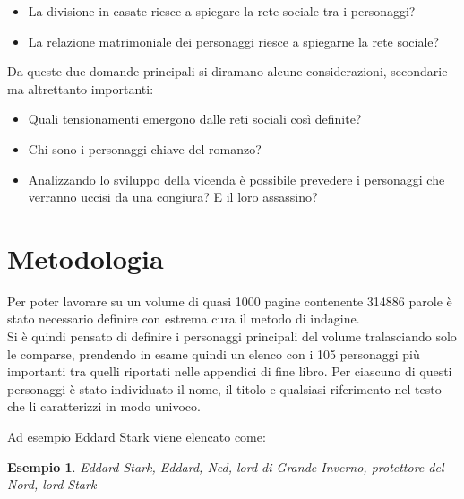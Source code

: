 \documentclass[a4paper]{article}
\begin{document}
\begin{itemize}
\item La divisione in casate riesce a spiegare la rete sociale tra i personaggi?
\item La relazione matrimoniale dei personaggi riesce a spiegarne la rete sociale?
\end{itemize}
Da queste due domande principali si diramano alcune considerazioni, secondarie ma altrettanto importanti:

\begin{itemize}
\item Quali tensionamenti emergono dalle reti sociali così definite?
\item Chi sono i personaggi chiave del romanzo?
\item Analizzando lo sviluppo della vicenda è possibile prevedere i personaggi che verranno uccisi da una congiura? E il loro assassino?
\end{itemize}

\section{Metodologia}

Per poter lavorare su un volume di quasi 1000 pagine contenente 314886 parole è stato necessario definire con estrema cura il metodo di indagine.\\
Si è quindi pensato di definire i personaggi principali del volume tralasciando solo le comparse, prendendo in esame quindi un elenco con i 105 personaggi più importanti tra quelli riportati nelle appendici di fine libro. Per ciascuno di questi personaggi è stato individuato il nome, il titolo e qualsiasi riferimento nel testo che li caratterizzi in modo univoco.\\
\newtheorem{xxx}{Esempio}
Ad esempio Eddard Stark viene elencato come:
\begin{xxx}
Eddard Stark, Eddard, Ned, lord di Grande Inverno, protettore del Nord, lord Stark
\end{xxx}
\end{document}
